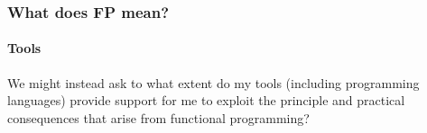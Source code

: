 \begin{frame}[fragile]
\frametitle{What does FP mean?}
\framesubtitle{Tools}
\begin{block}{We might instead ask}
to what extent do my tools (including programming languages) provide support for me to exploit the principle and practical consequences that arise from functional programming?
\end{block}
\end{frame}
